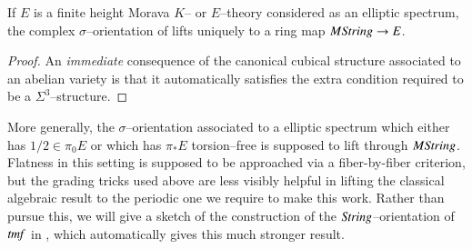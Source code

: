 \begin{corollary}\label{EllipticSpectraAreOrientedByString}
If $E$ is a finite height Morava $K$-- or $E$--theory considered as an elliptic spectrum, the complex $\sigma$--orientation of  lifts uniquely to a ring map $M\mathit{String} \to E$.
\end{corollary}
\begin{proof}
An \emph{immediate} consequence of the canonical cubical structure associated to an abelian variety is that it automatically satisfies the extra condition required to be a $\Sigma^3$--structure.
\end{proof}

\begin{remark}
More generally, the $\sigma$--orientation associated to a elliptic spectrum which either has $1/2 \in \pi_0 E$ or which has $\pi_* E$ torsion--free is supposed to lift through $M\mathit{String}$.  Flatness in this setting is supposed to be approached via a fiber-by-fiber criterion, but the grading tricks used above are less visibly helpful in lifting the classical algebraic result to the periodic one we require to make this work.  Rather than pursue this, we will give a sketch of the construction of the $\mathit{String}$--orientation of $\mathit{tmf}$ in , which automatically gives this much stronger result.
\end{remark}

